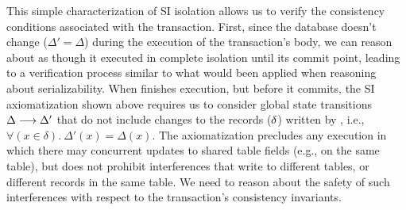 
\noindent This simple characterization of SI isolation allows us to
verify the consistency conditions associated with the 
transaction.  First, since the database doesn't change ($\Delta' =
\Delta$) during the execution of the transaction's body, we can reason
about  as though it executed in complete isolation until
its commit point, leading to a verification process similar to what
would been applied when reasoning about serializability.  When
 finishes execution, but before it commits, the SI
axiomatization shown above requires us to consider global state
transitions $\Delta \longrightarrow \Delta'$ that do not include changes
to the records ($\delta$) written by , i.e.,
$\forall(x\in\delta).~\Delta'(x) = \Delta(x)$.  The axiomatization
precludes any execution in which there may concurrent updates to
shared table fields (e.g.,  on the same 
table), but does not prohibit interferences that write to different
tables, or different records in the same table.  We need to reason
about the safety of such interferences with respect to the
transaction's consistency invariants.

